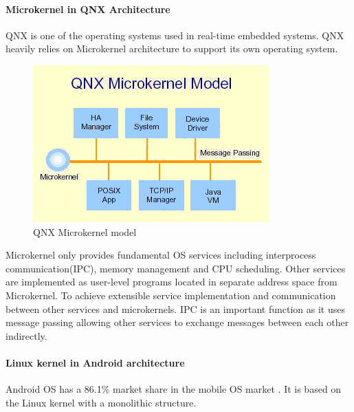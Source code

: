 \documentclass[conference]{IEEEtran}
\begin{document}
\paragraph{Microkernel in QNX Architecture}
QNX is one of the operating systems used in real-time embedded systems. QNX heavily relies on Microkernel architecture to support its own operating system\cite{Burger}\cite{Galvinbook}.



\begin{figure}[h]
\caption{QNX Microkernel model}
\begin{center}
\includegraphics[scale=0.5]{./images/QNX_microkernel_mode.png}
\end{center}
\end{figure}

Microkernel only provides fundamental OS services including interprocess communication(IPC), memory management and CPU scheduling\cite{Galvinbook}. Other services are implemented as user-level programs located in separate address space from Microkernel\cite{Galvinbook}. To achieve extensible service implementation and communication between other services and microkernels. IPC is an important function as it uses message passing\cite{Burger} allowing other services to exchange messages between each other indirectly.

\paragraph{Linux kernel in Android architecture}
Android OS has a 86.1\% market share in the mobile OS market \cite{SMS}. It is based on the Linux kernel with a monolithic structure.
\end{document}
